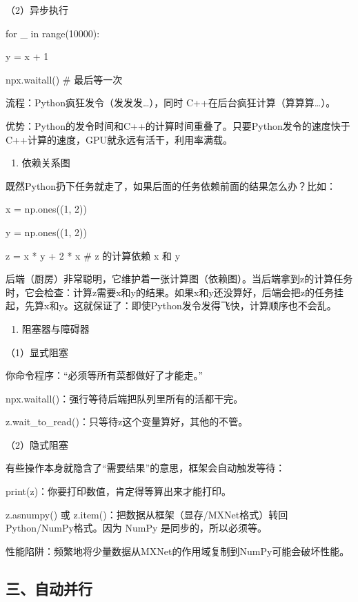 （2）异步执行

for \_ in range(10000):

y = x + 1

npx.waitall() \# 最后等一次

流程：Python疯狂发令（发发发\ldots），同时 C++在后台疯狂计算（算算算\ldots）。

优势：Python的发令时间和C++的计算时间重叠了。只要Python发令的速度快于C++计算的速度，GPU就永远有活干，利用率满载。

\begin{enumerate}
\def\labelenumi{\arabic{enumi}.}
\setcounter{enumi}{2}
\tightlist
\item
  依赖关系图
\end{enumerate}

既然Python扔下任务就走了，如果后面的任务依赖前面的结果怎么办？比如：

x = np.ones((1, 2))

y = np.ones((1, 2))

z = x * y + 2 * x \# z 的计算依赖 x 和 y

后端（厨房）非常聪明，它维护着一张计算图（依赖图）。当后端拿到z的计算任务时，它会检查：计算z需要x和y的结果。如果x和y还没算好，后端会把z的任务挂起，先算x和y。这就保证了：即使Python发令发得飞快，计算顺序也不会乱。

\begin{enumerate}
\def\labelenumi{\arabic{enumi}.}
\setcounter{enumi}{3}
\tightlist
\item
  阻塞器与障碍器
\end{enumerate}

（1）显式阻塞

你命令程序：``必须等所有菜都做好了才能走。''

npx.waitall()：强行等待后端把队列里所有的活都干完。

z.wait\_to\_read()：只等待z这个变量算好，其他的不管。

（2）隐式阻塞

有些操作本身就隐含了``需要结果''的意思，框架会自动触发等待：

print(z)：你要打印数值，肯定得等算出来才能打印。

z.asnumpy() 或 z.item()：把数据从框架（显存/MXNet格式）转回Python/NumPy格式。因为 NumPy 是同步的，所以必须等。

性能陷阱：频繁地将少量数据从MXNet的作用域复制到NumPy可能会破坏性能。

\hypertarget{ux4e09ux81eaux52a8ux5e76ux884c}{%
\subsection{三、自动并行}\label{ux4e09ux81eaux52a8ux5e76ux884c}}

